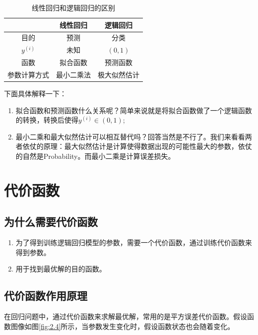 \begin{table}[h]
	\centering
	\begin{tabular}{|c|c|c|}\hline
		& 线性回归 & 逻辑回归 \\\hline
		目的 & 预测 & 分类 \\\hline
		$y^{(i)}$  & 未知 & $(0,1)$ \\\hline
		函数 & 拟合函数 & 预测函数 \\\hline
		参数计算方式 & 最小二乘法 & 极大似然估计 \\\hline
	\end{tabular}
	\caption{线性回归和逻辑回归的区别}
	\label{tab:2.3}
\end{table}


下面具体解释一下： 
\begin{enumerate}
\item 拟合函数和预测函数什么关系呢？简单来说就是将拟合函数做了一个逻辑函数的转换，转换后使得$y^{(i)} \in (0,1)$;
\item 最小二乘和最大似然估计可以相互替代吗？回答当然是不行了。我们来看看两者依仗的原理：最大似然估计是计算使得数据出现的可能性最大的参数，依仗的自然是Probability。而最小二乘是计算误差损失。
\end{enumerate}

\section{代价函数}

\subsection{为什么需要代价函数}

\begin{enumerate}
\item 为了得到训练逻辑回归模型的参数，需要一个代价函数，通过训练代价函数来得到参数。
\item 用于找到最优解的目的函数。
\end{enumerate}

\subsection{代价函数作用原理}
在回归问题中，通过代价函数来求解最优解，常用的是平方误差代价函数。假设函数图像如图\ref{fig:2.4}所示，当参数发生变化时，假设函数状态也会随着变化。

